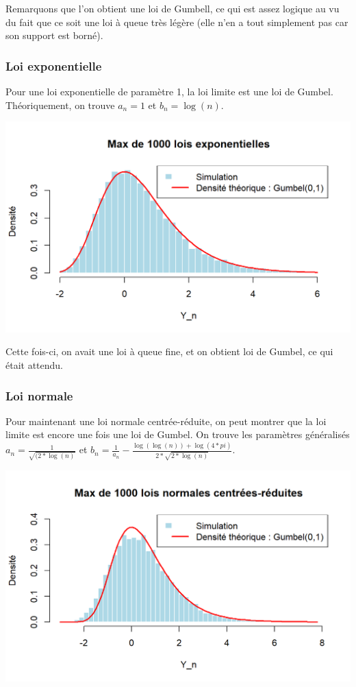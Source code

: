 \documentclass{article}
\begin{document}
\noindent Remarquons que l'on obtient une loi de Gumbell, ce qui est assez logique au vu du fait que ce soit une loi à queue très légère (elle n'en a tout simplement pas car son support est borné).

\subsubsection{Loi exponentielle}
\noindent Pour une loi exponentielle de paramètre 1, la loi limite est une loi de Gumbel. Théoriquement, on trouve $a_n = 1 $ et $b_n = \log(n) $.

\begin{center}
	\includegraphics[scale=0.8]{./Codes_R/Max_Expo.png} 
\end{center}

\noindent Cette fois-ci, on avait une loi à queue fine, et on obtient loi de Gumbel, ce qui était attendu.

\subsubsection{Loi normale}

\noindent Pour maintenant une loi normale centrée-réduite, on peut montrer que la loi limite est encore une fois une loi de Gumbel. On trouve les paramètres généralisés $a_n = \frac{1}{\sqrt{(2*\log(n)}} $ et $b_n = \frac{1}{a_n} - \frac{\log(\log(n)) + \log(4 * pi)}{2 * \sqrt{2 * \log(n)}} $.

\begin{center}
	\includegraphics[scale=0.8]{./Codes_R/Max_Normale.png} 
\end{center}
\end{document}
